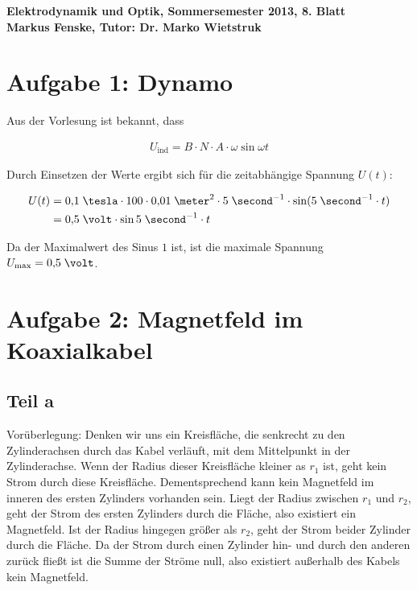 \documentclass[a4paper,german,12pt,smallheadings]{scrartcl}
\begin{document}
\begin{center}
\bfseries %
\sffamily %
\vspace{-40pt}
Elektrodynamik und Optik, Sommersemester 2013, 8. Blatt \\
Markus Fenske, Tutor: Dr. Marko Wietstruk
\vspace{-10pt}
\end{center}
\section*{Aufgabe 1: Dynamo}

Aus der Vorlesung ist bekannt, dass

\begin{align*}
  U_{\text{ind}} = B \cdot N \cdot A \cdot \omega \sin \omega t
\end{align*}

Durch Einsetzen der Werte ergibt sich für die zeitabhängige Spannung $U(t)$:

\begin{align*}
  U(t) &= 0{,}1 \;\tesla \cdot 100 \cdot 0{,}01 \;\meter^2 \cdot 5 \;\second^{-1} \cdot \sin(5 \;\second^{-1} \cdot t) \\
       &= 0{,}5 \;\volt \cdot \sin 5 \;\second^{-1} \cdot t
\end{align*}

Da der Maximalwert des Sinus $1$ ist, ist die maximale Spannung $U_{\text{max}} = 0{,}5 \;\volt$.

\section*{Aufgabe 2: Magnetfeld im Koaxialkabel}
\subsection*{Teil a}

Vorüberlegung: Denken wir uns ein Kreisfläche, die senkrecht zu den Zylinderachsen durch das
Kabel verläuft, mit dem Mittelpunkt in der Zylinderachse. Wenn der Radius
dieser Kreisfläche kleiner as $r_1$ ist, geht kein Strom durch diese
Kreisfläche. Dementsprechend kann kein Magnetfeld im inneren des ersten
Zylinders vorhanden sein. Liegt der Radius zwischen $r_1$ und $r_2$, geht der
Strom des ersten Zylinders durch die Fläche, also existiert ein Magnetfeld. Ist
der Radius hingegen größer als $r_2$, geht der Strom beider Zylinder durch die
Fläche. Da der Strom durch einen Zylinder hin- und durch den anderen zurück
fließt ist die Summe der Ströme null, also existiert außerhalb des Kabels kein
Magnetfeld.
\end{document}
